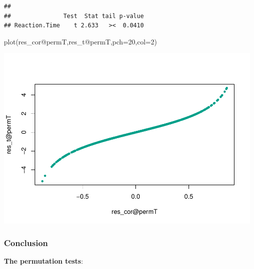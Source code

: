 \documentclass[
]{article}
\newenvironment{Shaded}{\begin{snugshade}}{\end{snugshade}}
\newcommand{\AttributeTok}[1]{\textcolor[rgb]{0.77,0.63,0.00}{#1}}
\newcommand{\DecValTok}[1]{\textcolor[rgb]{0.00,0.00,0.81}{#1}}
\newcommand{\FunctionTok}[1]{\textcolor[rgb]{0.00,0.00,0.00}{#1}}
\newcommand{\NormalTok}[1]{#1}
\newcommand{\SpecialCharTok}[1]{\textcolor[rgb]{0.00,0.00,0.00}{#1}}
\begin{document}
\begin{verbatim}
## 
##               Test  Stat tail p-value
## Reaction.Time    t 2.633   ><  0.0410
\end{verbatim}

\begin{Shaded}
\begin{Highlighting}[]
\FunctionTok{plot}\NormalTok{(res\_cor}\SpecialCharTok{@}\NormalTok{permT,res\_t}\SpecialCharTok{@}\NormalTok{permT,}\AttributeTok{pch=}\DecValTok{20}\NormalTok{,}\AttributeTok{col=}\DecValTok{2}\NormalTok{)}
\end{Highlighting}
\end{Shaded}

\begin{center}\includegraphics{perm_files/figure-latex/unnamed-chunk-19-1} \end{center}

\hypertarget{conclusion}{%
\subsubsection{Conclusion}\label{conclusion}}

\textbf{The permutation tests}:
\end{document}
